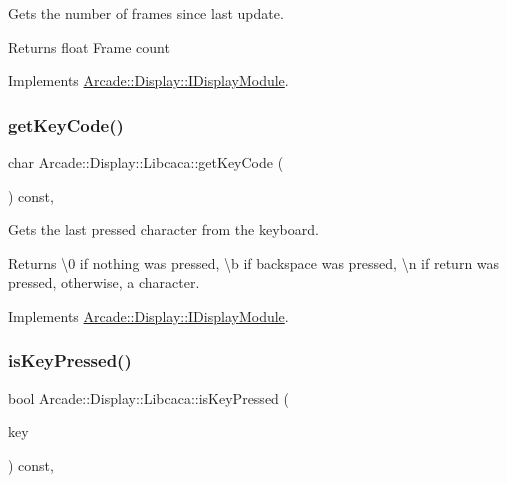 Gets the number of frames since last update. 

\begin{DoxyReturn}{Returns}
float Frame count 
\end{DoxyReturn}


Implements \mbox{\hyperlink{classArcade_1_1Display_1_1IDisplayModule_aab078d82e6fdd32682553947c20226ac}{Arcade\+::\+Display\+::\+I\+Display\+Module}}.

\mbox{\label{classArcade_1_1Display_1_1Libcaca_a741fdec5c2e77cc7959e5f3444f8c8ac}} 
\subsubsection{\texorpdfstring{getKeyCode()}{getKeyCode()}}
{\footnotesize\ttfamily char Arcade\+::\+Display\+::\+Libcaca\+::get\+Key\+Code (\begin{DoxyParamCaption}{ }\end{DoxyParamCaption}) const\hspace{0.3cm}{\ttfamily [final]}, {\ttfamily [virtual]}}



Gets the last pressed character from the keyboard. 

\begin{DoxyReturn}{Returns}
\textbackslash{}0 if nothing was pressed, \textbackslash{}b if backspace was pressed, \textbackslash{}n if return was pressed, otherwise, a character. 
\end{DoxyReturn}


Implements \mbox{\hyperlink{classArcade_1_1Display_1_1IDisplayModule_a403f8a0f065dad707a881ef3cee79805}{Arcade\+::\+Display\+::\+I\+Display\+Module}}.

\mbox{\label{classArcade_1_1Display_1_1Libcaca_a4d76639289eee2453a416ff0fc051fe3}} 
\subsubsection{\texorpdfstring{isKeyPressed()}{isKeyPressed()}}
{\footnotesize\ttfamily bool Arcade\+::\+Display\+::\+Libcaca\+::is\+Key\+Pressed (\begin{DoxyParamCaption}\item[{\mbox{\hyperlink{classArcade_1_1Display_1_1IDisplayModule_a8da3f6b309ca0581473ae8cc8789b619}{I\+Display\+Module\+::\+Keys}}}]{key }\end{DoxyParamCaption}) const\hspace{0.3cm}{\ttfamily [final]}, {\ttfamily [virtual]}}



